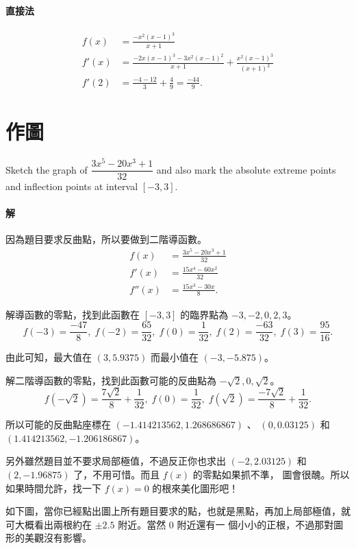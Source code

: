 \documentclass[a4paper,12pt]{article}
\begin{document}
\begin{CJK}{UTF8}{bsmi}
\paragraph{直接法}
\begin{align*}
f(x) &= \frac{-x^2 (x-1)^3}{x+1}\\
f'(x) &= \frac{-2x (x-1)^3 - 3x^2 (x-1)^2}{x+1} + \frac{x^2 (x-1)^3}{(x+1)^2}\\
f'(2) &= \frac{-4 - 12}{3} + \frac{4}{9} = \frac{-44}{9}.
\end{align*}

\section{作圖}
Sketch the graph of $\dfrac{3x^5 - 20x^3 + 1}{32}$ and also mark the absolute extreme points and inflection points at
interval $[-3, 3]$.

\paragraph{解}
因為題目要求反曲點，所以要做到二階導函數。
\begin{align*}
  f(x) &= \frac{3x^5 - 20x^3 + 1}{32}\\
 f'(x) &= \frac{15x^4 - 60x^2}{32}\\
f''(x) &= \frac{15x^3 - 30x}{8}.
\end{align*}

解導函數的零點，找到此函數在 $[-3,3]$ 的臨界點為 $-3, -2, 0, 2, 3$。
\[f(-3)=\frac{-47}{8},\; f(-2)=\frac{65}{32},\; f(0)=\frac{1}{32},\; f(2)=\frac{-63}{32},\; f(3)=\frac{95}{16}.\]

由此可知，最大值在 $(3,5.9375)$ 而最小值在 $(-3,-5.875)$。

解二階導函數的零點，找到此函數可能的反曲點為 $-\sqrt2, 0, \sqrt2$。
\[f(-\sqrt2) = \frac{7\sqrt2}{8} + \frac{1}{32},\; f(0)=\frac{1}{32},\; f(\sqrt2) = \frac{-7\sqrt2}{8} + \frac{1}{32}.\]

所以可能的反曲點座標在 $(-1.414213562,1.268686867)$ 、 $(0,0.03125)$ 和 $(1.414213562,-1.206186867)$。

另外雖然題目並不要求局部極值，不過反正你也求出 $(-2,2.03125)$ 和 $(2,-1.96875)$ 了，不用可惜。而且 $f(x)$ 的零點如果抓不準，%
圖會很醜。所以如果時間允許，找一下 $f(x)=0$ 的根來美化圖形吧！

如下圖，當你已經點出圖上所有題目要求的點，也就是黑點，再加上局部極值，就可大概看出兩根約在 $\pm 2.5$ 附近。當然 0 附近還有一%
個小小的正根，不過那對圖形的美觀沒有影響。


\end{CJK}
\end{document}
